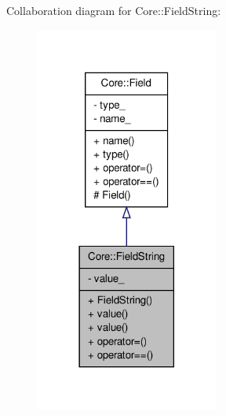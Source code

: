 Collaboration diagram for Core::FieldString:
\nopagebreak
\begin{figure}[H]
\begin{center}
\leavevmode
\includegraphics[width=170pt]{d3/df7/classCore_1_1FieldString__coll__graph}
\end{center}
\end{figure}
